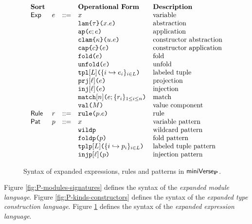 \begin{figure}
\[\begin{array}{lllllll}
\textbf{Sort} & & & \textbf{Operational Form} 
& \textbf{Description}\\
\mathsf{Exp} & e & ::= & x 
& \text{variable}\\
&&& \aelam{\tau}{x}{e} 
& \text{abstraction}\\
&&& \aeap{e}{e} 
& \text{application}\\
&&& \aeclam{\kappa}{u}{e} %
& \text{constructor abstraction}\\
&&& \aecap{e}{c} %
& \text{constructor application}\\
&&& \aefold{e} %
& \text{fold}\\
&&& \aeunfold{e} %
& \text{unfold}\\
&&& \aetpl{\labelset}{\mapschema{e}{i}{\labelset}} 
& \text{labeled tuple}\\
&&& \aepr{\ell}{e} 
& \text{projection}\\
&&& \aein{\ell}{e} 
& \text{injection}\\
&&& \aematchwith{n}{e}{\seqschemaX{r}} 
& \text{match}\\
&&& \amval{M} 
& \text{value component}\\
\mathsf{Rule} & r & ::= & \aematchrule{p}{e} 
& \text{rule}\\
\mathsf{Pat} & p & ::= & x 
& \text{variable pattern}\\
&&& \aewildp 
& \text{wildcard pattern}\\
&&& \aefoldp{p} 
& \text{fold pattern}\\
&&& \aetplp{\labelset}{\mapschema{p}{i}{\labelset}} 
& \text{labeled tuple pattern}\\
&&& \aeinjp{\ell}{p} 
& \text{injection pattern}
\end{array}\]
\caption[Syntax of expanded expressions, rules and patterns in $\miniVerseParam$]{Syntax of expanded expressions, rules and patterns in $\miniVerseParam$.}
\label{fig:P-expanded-terms}
\end{figure}


Figure \ref{fig:P-modules-signatures} defines the syntax of the \emph{expanded module language}. Figure \ref{fig:P-kinds-constructors} defines the syntax of the \emph{expanded type construction language}. Figure \ref{fig:P-expanded-terms} defines the syntax of the \emph{expanded expression language}.


